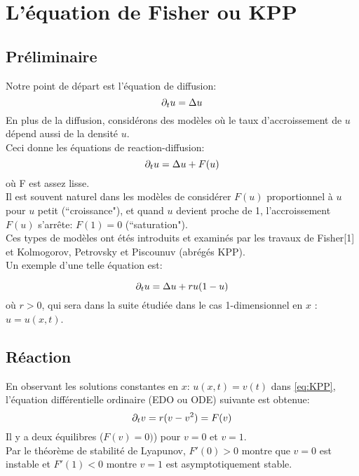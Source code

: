 \documentclass[11pt]{article}
\begin{document}
\fi

\section{L'équation de Fisher ou KPP}
\subsection{Préliminaire}
Notre point de départ est l'équation de diffusion:\begin{equation}\partial_t u = \Delta u  \end{equation}
En plus de la diffusion, considérons des modèles où le taux d'accroissement de $u$ dépend aussi de la densité $u$.\\
Ceci donne les équations de reaction-diffusion:
\begin{equation}\partial_t u = \Delta u + F(u) \label{eq:ReaDi} \end{equation} 
où F est assez lisse.\\
Il est souvent naturel dans les modèles de considérer $F(u)$ proportionnel à  $u$ pour $u$ petit (``croissance"), et quand $u$ devient proche de 1, l'accroissement $F(u)$ s'arrête: $F(1)=0$ (``saturation").\\
Ces types de modèles ont étés introduits et examinés par les travaux de Fisher[1] %
et Kolmogorov, Petrovsky et Piscounuv (abrégés KPP).\\ %
Un exemple d'une telle équation est:

\begin{equation}
	\partial_t u = \Delta u + ru(1-u) \label{eq:KPP}
\end{equation}
où $r>0$, qui sera dans la suite étudiée dans le cas 1-dimensionnel en $x$ : $u=u(x,t)$.

\subsection{Réaction}
En observant les solutions constantes en $x$: $u(x,t)=v(t)$ dans \eqref{eq:KPP}, l'équation différentielle ordinaire (EDO ou ODE) suivante est obtenue: \begin{equation}
	\partial_t v = r(v - v^2) = F(v)
\end{equation}
Il y a deux équilibres ($F(v)=0)$) pour $v=0$ et $v=1$.\\
Par le théorème de stabilité de Lyapunov, $F'(0)>0$ montre que $v=0$ est instable et $F'(1)<0$ montre $v=1$ est asymptotiquement stable.
\end{document}
